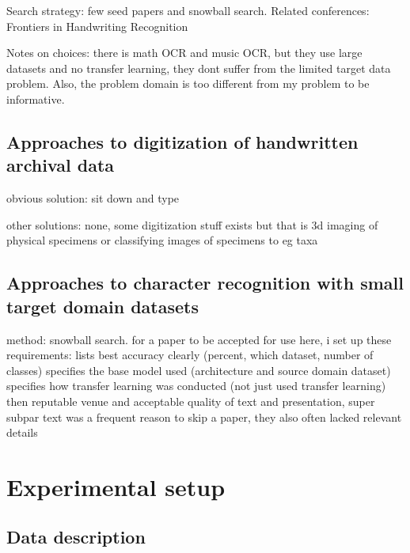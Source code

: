 \documentclass{article}
\begin{document}

Search strategy: few seed papers and snowball search. Related conferences: 
Frontiers in Handwriting Recognition

Notes on choices: there is math OCR and music OCR, but they use large datasets and no transfer learning, they dont suffer from the limited target data problem. Also, the problem domain is too different from my problem to be informative.

\subsection{Approaches to digitization of handwritten archival data}

obvious solution: sit down and type

other solutions: none, some digitization stuff exists but that is 3d imaging of physical specimens
or classifying images of specimens to eg taxa

\subsection{Approaches to character recognition with small target domain datasets}

method: snowball search. for a paper to be accepted for use here, i set up these requirements:
lists best accuracy clearly (percent, which dataset, number of classes)
specifies the base model used (architecture and source domain dataset)
specifies how transfer learning was conducted (not just used transfer learning)
then reputable venue and acceptable quality of text and presentation, super subpar text was a frequent reason to skip a paper, they also often lacked relevant details

\section{Experimental setup}


\subsection{Data description}
\end{document}
